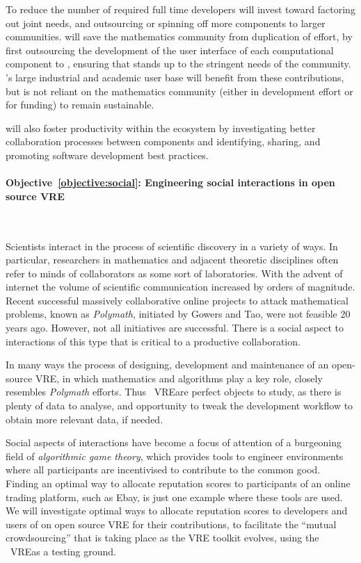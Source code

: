 \documentclass[noworkareas,deliverables,\classoptions]{euproposal}       %
\newcommand{\VREs}{VRE}
\begin{document}
\begin{proposal}

To reduce the number of required full time developers \TheProject will
invest toward factoring out joint needs, and outsourcing or spinning
off more components to larger communities.  \TheProject will save the
mathematics community from duplication of effort, by first outsourcing
the development of the user interface of each computational component
to \Jupyter, ensuring that \Jupyter stands up to the stringent needs
of the community. \Jupyter's large industrial and academic user base
will benefit from these contributions, but is not reliant on the
mathematics community (either in development effort or for funding) to
remain sustainable.

\TheProject will also foster productivity within the ecosystem by
investigating better collaboration processes between components and
identifying, sharing, and promoting software development best
practices.

\paragraph{Objective~\ref{objective:social}: Engineering social
  interactions in open source \VREs}\ 

Scientists interact in the process of scientific discovery in a
variety of ways.  In particular, researchers in mathematics and
adjacent theoretic disciplines often refer to minds of collaborators
as some sort of laboratories. With the advent of internet the volume
of scientific communication increased by orders of magnitude. Recent
successful massively collaborative online projects to attack
mathematical problems, known as \emph{Polymath}, initiated by Gowers
and Tao, were not feasible 20 years ago. However, not all initiatives
are successful. There is a social aspect to interactions of this type
that is critical to a productive collaboration.

In many ways the process of designing, development and maintenance of
an open-source VRE, in which mathematics and algorithms play a key
role, closely resembles \emph{Polymath} efforts.  Thus \TheProject\
\VREs are perfect objects to study, as there is plenty of data to
analyse, and opportunity to tweak the development workflow to obtain
more relevant data, if needed.

Social aspects of interactions have become a focus of attention of a
burgeoning field of \emph{algorithmic game theory}, which provides
tools to engineer environments where all participants are incentivised
to contribute to the common good.  Finding an optimal way to allocate
reputation scores to participants of an online trading platform, such
as Ebay, is just one example where these tools are used. We will
investigate optimal ways to allocate reputation scores to developers
and users of on open source VRE for their contributions, to facilitate
the ``mutual crowdsourcing'' that is taking place as the VRE toolkit
evolves, using the \TheProject\ \VREs as a testing ground.


\end{proposal}
\end{document}
